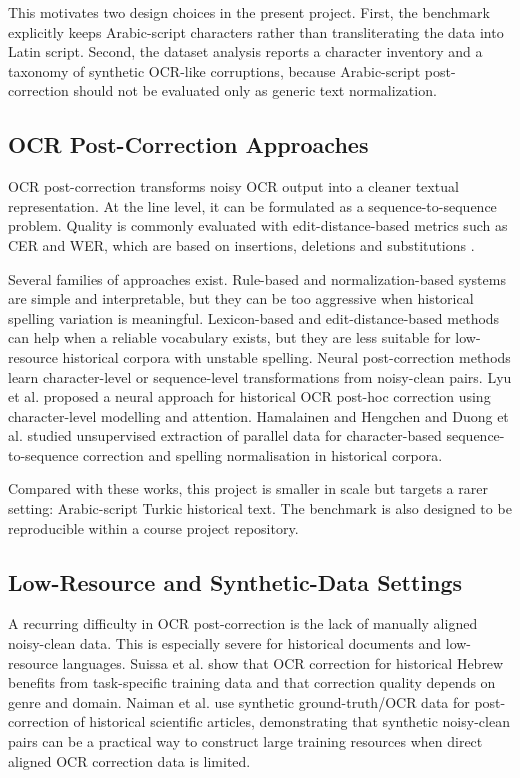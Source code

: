 \documentclass{article}
\begin{document}
This motivates two design choices in the present project. First, the benchmark explicitly keeps Arabic-script characters rather than transliterating the data into Latin script. Second, the dataset analysis reports a character inventory and a taxonomy of synthetic OCR-like corruptions, because Arabic-script post-correction should not be evaluated only as generic text normalization.

\subsection{OCR Post-Correction Approaches}

OCR post-correction transforms noisy OCR output into a cleaner textual representation. At the line level, it can be formulated as a sequence-to-sequence problem. Quality is commonly evaluated with edit-distance-based metrics such as CER and WER, which are based on insertions, deletions and substitutions \cite{levenshtein1966binary}.

Several families of approaches exist. Rule-based and normalization-based systems are simple and interpretable, but they can be too aggressive when historical spelling variation is meaningful. Lexicon-based and edit-distance-based methods can help when a reliable vocabulary exists, but they are less suitable for low-resource historical corpora with unstable spelling. Neural post-correction methods learn character-level or sequence-level transformations from noisy-clean pairs. Lyu et al. \cite{lyu2021neural} proposed a neural approach for historical OCR post-hoc correction using character-level modelling and attention. Hamalainen and Hengchen \cite{hamalainen2019paft} and Duong et al. \cite{duong2020unsupervised} studied unsupervised extraction of parallel data for character-based sequence-to-sequence correction and spelling normalisation in historical corpora.

Compared with these works, this project is smaller in scale but targets a rarer setting: Arabic-script Turkic historical text. The benchmark is also designed to be reproducible within a course project repository.

\subsection{Low-Resource and Synthetic-Data Settings}

A recurring difficulty in OCR post-correction is the lack of manually aligned noisy-clean data. This is especially severe for historical documents and low-resource languages. Suissa et al. \cite{suissa2023optimizing} show that OCR correction for historical Hebrew benefits from task-specific training data and that correction quality depends on genre and domain. Naiman et al. \cite{naiman2023large} use synthetic ground-truth/OCR data for post-correction of historical scientific articles, demonstrating that synthetic noisy-clean pairs can be a practical way to construct large training resources when direct aligned OCR correction data is limited.
\end{document}

